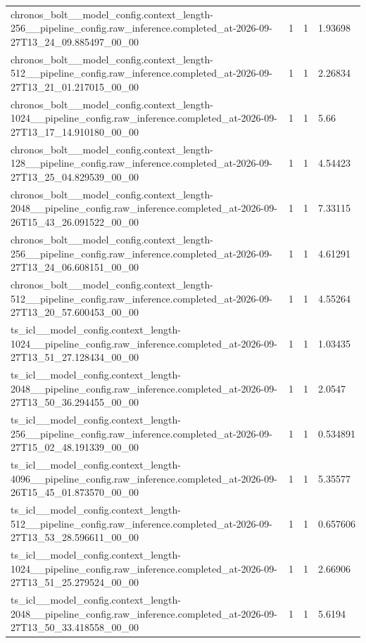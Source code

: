 \begin{tabular}{llll}
chronos\_bolt\_\_model\_config.context\_length-256\_\_pipeline\_config.raw\_inference.completed\_at-2026-09-27T13\_24\_09.885497\_00\_00 & 1 & 1 & 1.93698 \\
chronos\_bolt\_\_model\_config.context\_length-512\_\_pipeline\_config.raw\_inference.completed\_at-2026-09-27T13\_21\_01.217015\_00\_00 & 1 & 1 & 2.26834 \\
chronos\_bolt\_\_model\_config.context\_length-1024\_\_pipeline\_config.raw\_inference.completed\_at-2026-09-27T13\_17\_14.910180\_00\_00 & 1 & 1 & 5.66 \\
chronos\_bolt\_\_model\_config.context\_length-128\_\_pipeline\_config.raw\_inference.completed\_at-2026-09-27T13\_25\_04.829539\_00\_00 & 1 & 1 & 4.54423 \\
chronos\_bolt\_\_model\_config.context\_length-2048\_\_pipeline\_config.raw\_inference.completed\_at-2026-09-26T15\_43\_26.091522\_00\_00 & 1 & 1 & 7.33115 \\
chronos\_bolt\_\_model\_config.context\_length-256\_\_pipeline\_config.raw\_inference.completed\_at-2026-09-27T13\_24\_06.608151\_00\_00 & 1 & 1 & 4.61291 \\
chronos\_bolt\_\_model\_config.context\_length-512\_\_pipeline\_config.raw\_inference.completed\_at-2026-09-27T13\_20\_57.600453\_00\_00 & 1 & 1 & 4.55264 \\
ts\_icl\_\_model\_config.context\_length-1024\_\_pipeline\_config.raw\_inference.completed\_at-2026-09-27T13\_51\_27.128434\_00\_00 & 1 & 1 & 1.03435 \\
ts\_icl\_\_model\_config.context\_length-2048\_\_pipeline\_config.raw\_inference.completed\_at-2026-09-27T13\_50\_36.294455\_00\_00 & 1 & 1 & 2.0547 \\
ts\_icl\_\_model\_config.context\_length-256\_\_pipeline\_config.raw\_inference.completed\_at-2026-09-27T15\_02\_48.191339\_00\_00 & 1 & 1 & 0.534891 \\
ts\_icl\_\_model\_config.context\_length-4096\_\_pipeline\_config.raw\_inference.completed\_at-2026-09-26T15\_45\_01.873570\_00\_00 & 1 & 1 & 5.35577 \\
ts\_icl\_\_model\_config.context\_length-512\_\_pipeline\_config.raw\_inference.completed\_at-2026-09-27T13\_53\_28.596611\_00\_00 & 1 & 1 & 0.657606 \\
ts\_icl\_\_model\_config.context\_length-1024\_\_pipeline\_config.raw\_inference.completed\_at-2026-09-27T13\_51\_25.279524\_00\_00 & 1 & 1 & 2.66906 \\
ts\_icl\_\_model\_config.context\_length-2048\_\_pipeline\_config.raw\_inference.completed\_at-2026-09-27T13\_50\_33.418558\_00\_00 & 1 & 1 & 5.6194 \\

\end{tabular}
